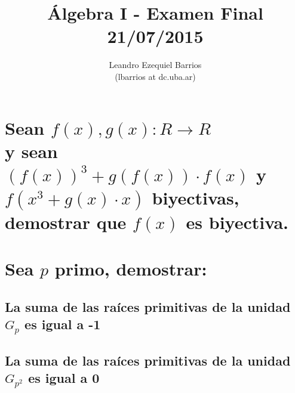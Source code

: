 \documentclass[a4paper,spanish]{article}
\begin{document}
\title{Álgebra I - Examen Final\\21/07/2015}
\author{\small Leandro Ezequiel Barrios \\ \footnotesize(lbarrios at dc.uba.ar)}
\date{}
\maketitle

\newpage
\section{%
  Sean $f(x),g(x) : R \rightarrow R$ \\
  y sean $(f(x))^3 + g(f(x)) \cdot f(x)$ y $f(x^3+g(x) \cdot x)$ biyectivas, \\
  demostrar que $f(x)$ es biyectiva.
}

\newpage
\section{%
  Sea $p$ primo, demostrar:
}
  \subsection{%
    La suma de las raíces primitivas de la unidad $G_p$ es igual a -1
  }

  \subsection{%
    La suma de las raíces primitivas de la unidad $G_{p^2}$ es igual a 0
  }

\newpage
\end{document}

